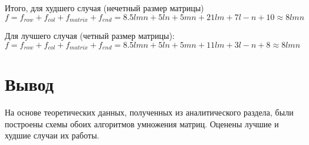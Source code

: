 Итого, для худшего случая (нечетный размер матрицы) $f = f_{row} + f_{col} + f_{matrix} + f_{end} = 8.5lmn + 5ln + 5mn + 21lm + 7l - n + 10 \approx 8lmn$

Для лучшего случая (четный размер матрицы): $f = f_{row} + f_{col} + f_{matrix} + f_{end} = 8.5lmn + 5ln + 5mn + 11lm + 3l - n + 8 \approx 8lmn$

\section*{Вывод}

На основе теоретических данных, полученных из аналитического раздела, были построены схемы обоих алгоритмов умножения матриц.
Оценены лучшие и худшие случаи их работы.
